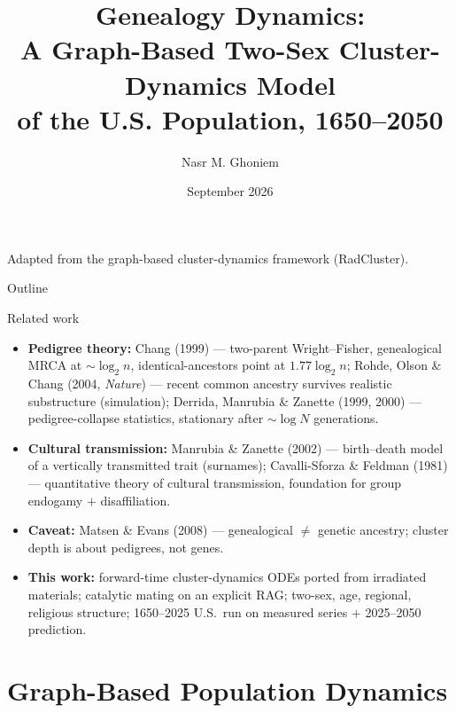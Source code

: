 \documentclass[10pt]{beamer}
\title[Genealogy Dynamics]{Genealogy Dynamics:\\ A Graph-Based Two-Sex Cluster-Dynamics Model\\ of the U.S. Population, 1650--2050}
\author[N.M. Ghoniem]{Nasr M. Ghoniem}
\institute[UCLA]{Department of Mechanical \& Aerospace Engineering\\
University of California, Los Angeles}
\date[Sept 2026]{September 2026}
\begin{document}
\begin{frame}
  \titlepage
  \begin{center}
    \small\textcolor{nmgray}{Adapted from the graph-based cluster-dynamics framework (RadCluster).}
  \end{center}
\end{frame}

\begin{frame}{Outline}
  \tableofcontents
\end{frame}

\begin{frame}{Related work}
  \small
  \begin{itemize}
    \item \textbf{Pedigree theory:} Chang (1999) --- two-parent Wright--Fisher,
      genealogical MRCA at $\sim\!\log_2 n$, identical-ancestors point at
      $1.77\log_2 n$; Rohde, Olson \& Chang (2004, \textit{Nature}) ---
      recent common ancestry survives realistic substructure (simulation);
      Derrida, Manrubia \& Zanette (1999, 2000) --- pedigree-collapse
      statistics, stationary after $\sim\!\log N$ generations.
    \item \textbf{Cultural transmission:} Manrubia \& Zanette (2002) ---
      birth--death model of a vertically transmitted trait (surnames);
      Cavalli-Sforza \& Feldman (1981) --- quantitative theory of cultural
      transmission, foundation for group endogamy $+$ disaffiliation.
    \item \textbf{Caveat:} Matsen \& Evans (2008) --- genealogical $\ne$
      genetic ancestry; cluster depth is about pedigrees, not genes.
    \item \textbf{This work:} forward-time cluster-dynamics ODEs ported from
      irradiated materials; catalytic mating on an explicit RAG; two-sex,
      age, regional, religious structure; 1650--2025 U.S.\ run on measured
      series $+$ 2025--2050 prediction.
  \end{itemize}
\end{frame}

\section{Graph-Based Population Dynamics}
\end{document}
